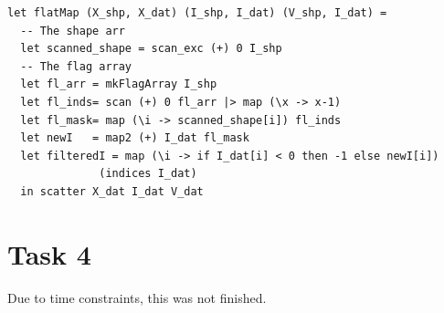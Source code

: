 \documentclass[11pt]{article}
\begin{document}
\begin{verbatim}
let flatMap (X_shp, X_dat) (I_shp, I_dat) (V_shp, I_dat) =
  -- The shape arr
  let scanned_shape = scan_exc (+) 0 I_shp
  -- The flag array
  let fl_arr = mkFlagArray I_shp
  let fl_inds= scan (+) 0 fl_arr |> map (\x -> x-1)
  let fl_mask= map (\i -> scanned_shape[i]) fl_inds
  let newI   = map2 (+) I_dat fl_mask
  let filteredI = map (\i -> if I_dat[i] < 0 then -1 else newI[i])
		      (indices I_dat)
  in scatter X_dat I_dat V_dat	      
\end{verbatim}

\section{Task 4}
\label{sec:org19414d6}
Due to time constraints, this was not finished.
\end{document}
